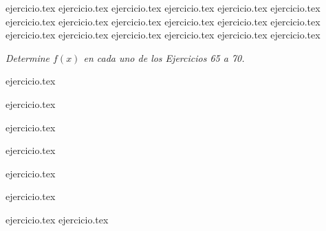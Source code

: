 \vspace{1em}
\begin{enumerate}
    \setcounter{enumi}{46}
    {ejercicio.tex}
    {ejercicio.tex}
    {ejercicio.tex}
    {ejercicio.tex}
    {ejercicio.tex}
    {ejercicio.tex}
    {ejercicio.tex}
    {ejercicio.tex}
    {ejercicio.tex}
    {ejercicio.tex}
    {ejercicio.tex}
    {ejercicio.tex}
    {ejercicio.tex}
    {ejercicio.tex}
    {ejercicio.tex}
    {ejercicio.tex}
    {ejercicio.tex}
    {ejercicio.tex}
\end{enumerate}

\noindent \textit{Determine $f(x)$ en cada uno de los Ejercicios 65 a 70.}

\begin{enumerate}
    \setcounter{enumi}{64}
    \begin{minipage}{0.45\textwidth}
    {ejercicio.tex}
    \addtocounter{enumi}{1}
    {ejercicio.tex}
    \addtocounter{enumi}{1}
    {ejercicio.tex}
    \end{minipage}%
    \begin{minipage}{0.45\textwidth}
    \setcounter{enumi}{65}
    {ejercicio.tex}
    \addtocounter{enumi}{1}
    {ejercicio.tex}
    \addtocounter{enumi}{1}
    {ejercicio.tex}
    \end{minipage}
\end{enumerate}

\vspace{1em}
\begin{enumerate}
    \setcounter{enumi}{70}
    {ejercicio.tex}
    {ejercicio.tex}
\end{enumerate}
